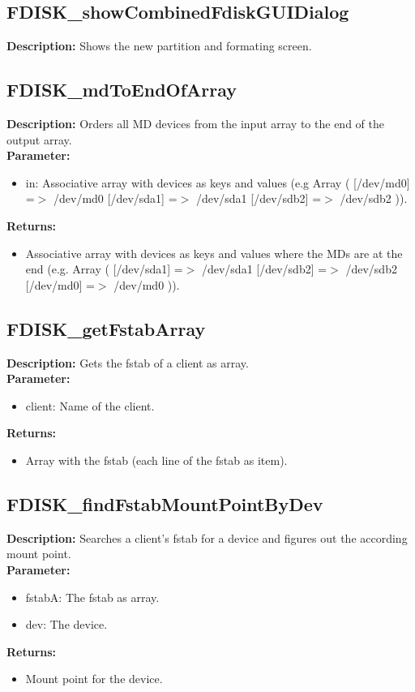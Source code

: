 \subsection{FDISK\_showCombinedFdiskGUIDialog}
\textbf{Description:} Shows the new partition and formating screen.\\

\subsection{FDISK\_mdToEndOfArray}
\textbf{Description:} Orders all MD devices from the input array to the end of the output array.\\
\textbf{Parameter:}
\begin{itemize}
\item in: Associative array with devices as keys and values (e.g Array ( [/dev/md0] =$>$ /dev/md0 [/dev/sda1] =$>$ /dev/sda1 [/dev/sdb2] =$>$ /dev/sdb2 )).
\end{itemize}
\textbf{Returns:}
\begin{itemize}
\item Associative array with devices as keys and values where the MDs are at the end (e.g. Array ( [/dev/sda1] =$>$ /dev/sda1 [/dev/sdb2] =$>$ /dev/sdb2 [/dev/md0] =$>$ /dev/md0 )).
\end{itemize}

\subsection{FDISK\_getFstabArray}
\textbf{Description:} Gets the fstab of a client as array.\\
\textbf{Parameter:}
\begin{itemize}
\item client: Name of the client.
\end{itemize}
\textbf{Returns:}
\begin{itemize}
\item Array with the fstab (each line of the fstab as item).
\end{itemize}

\subsection{FDISK\_findFstabMountPointByDev}
\textbf{Description:} Searches a client's fstab for a device and figures out the according mount point.\\
\textbf{Parameter:}
\begin{itemize}
\item fstabA: The fstab as array.
\item dev: The device.
\end{itemize}
\textbf{Returns:}
\begin{itemize}
\item Mount point for the device.
\end{itemize}

